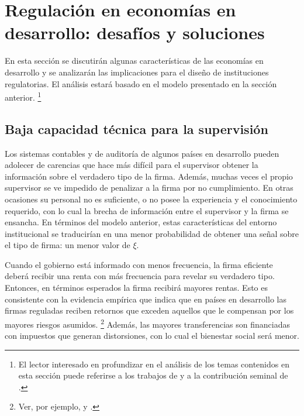 \documentclass[
  12pt,
  spanish,
]{book}
\begin{document}
\hypertarget{desafios}{%
\section{Regulación en economías en desarrollo: desafíos y soluciones}\label{desafios}}

En esta sección se discutirán algunas características de las economías en desarrollo y se analizarán las implicaciones para el diseño de instituciones regulatorias. El análisis estará basado en el modelo presentado en la sección anterior.
\footnote{El lector interesado en profundizar en el análisis de los temas contenidos en esta sección puede referirse a los trabajos de \citet{Estache2009} y a la contribución seminal de \citet{Laffont2005}.}

\hypertarget{baja-capacidad-tuxe9cnica-para-la-supervisiuxf3n}{%
\subsection{Baja capacidad técnica para la supervisión}\label{baja-capacidad-tuxe9cnica-para-la-supervisiuxf3n}}

Los sistemas contables y de auditoría de algunos países en desarrollo pueden adolecer de carencias que hace más difícil para el supervisor obtener la información sobre el verdadero tipo de la firma. Además, muchas veces el propio supervisor se ve impedido de penalizar a la firma por no cumplimiento. En otras ocasiones su personal no es suficiente, o no posee la experiencia y el conocimiento requerido, con lo cual la brecha de información entre el supervisor y la firma se ensancha. En términos del modelo anterior, estas características del entorno institucional se traducirían en una menor probabilidad de obtener una señal sobre el tipo de firma: un menor valor de \(ξ\).

Cuando el gobierno está informado con menos frecuencia, la firma eficiente deberá recibir una renta con más frecuencia para revelar su verdadero tipo. Entonces, en términos esperados la firma recibirá mayores rentas. Esto es consistente con la evidencia empírica que indica que en países en desarrollo las firmas reguladas reciben retornos que exceden aquellos que le compensan por los mayores riesgos asumidos.
\footnote{Ver, por ejemplo, \citet{Sirtaine2005} y \citet{Guasch2007}.}
Además, las mayores transferencias son financiadas con impuestos que generan distorsiones, con lo cual el bienestar social será menor.
\end{document}
